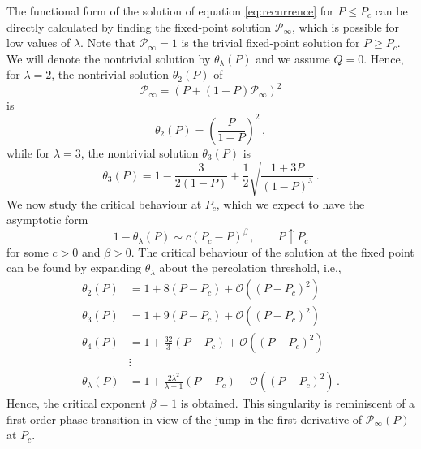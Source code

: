 \documentclass[amsmath,amssymb,amsfonts,aps,pre,preprint,superscriptaddress,bibnotes,showpacs,showkeys,longbibliography,nofootinbib]{revtex4-1}
\begin{document}
The functional form of the solution of equation \eqref{eq:recurrence} for $P\leq P_c$ can be directly calculated by finding the fixed-point solution $\mathcal{P}_\infty$, which is possible for low values of $\lambda$. Note that $\mathcal{P}_\infty = 1$ is the trivial fixed-point solution for $P\geq P_c$. We will denote the nontrivial solution by $\theta_\lambda(P)$ and we assume $Q=0$. Hence, for $\lambda=2$, the nontrivial solution $\theta_2(P)$ of
\begin{equation}
    \mathcal{P}_\infty = \left(P + (1-P) \mathcal{P}_\infty\right)^2
\end{equation}
is
\begin{equation}
    \label{eq:FP_L2}
    \theta_2(P) = \left(\frac{P}{1-P}\right)^2\, ,
\end{equation}
while for $\lambda=3$, the nontrivial solution $\theta_3(P)$ is
\begin{equation}
    \label{eq:FP_L3}
    \theta_3(P) = 1-\frac{3}{2 (1-P)} + \frac{1}{2}\sqrt{\frac{1+3P}{(1-P)^3}}\, .
\end{equation}
We now study the critical behaviour at $P_c$, which we expect to have the asymptotic form
\begin{equation}
    \label{eq:general_form}
    1 - \theta_\lambda(P)  \sim c(P_c-P)^\beta \, , \qquad P\uparrow P_c 
\end{equation}
for some $c>0$ and $\beta>0$. The critical behaviour of the solution at the fixed point can be found by expanding $\theta_\lambda$ about the percolation threshold, i.e.,
\begin{equation}
    \label{eq:expansion_FP}
    \begin{split}
        \theta_2(P) &= 1 + 8 (P-P_c) +\mathcal{O}((P-P_c)^2)\\
        \theta_3(P) &= 1 + 9 (P-P_c) + \mathcal{O}((P-P_c)^2)\\
        \theta_4(P) &= 1 + \frac{32}{3}(P-P_c) + \mathcal{O}((P-P_c)^2)\\
        &\vdots\\
        \theta_\lambda(P) &= 1+ \frac{2\lambda^2}{\lambda-1}(P-P_c) +\mathcal{O}((P-P_c)^2)\, .
    \end{split}
\end{equation}
Hence, the critical exponent $\beta = 1$ is obtained. This singularity is reminiscent of a first-order phase transition in view of the jump  in the first derivative of $\mathcal{P}_\infty(P)$ at $P_c$.
\end{document}
